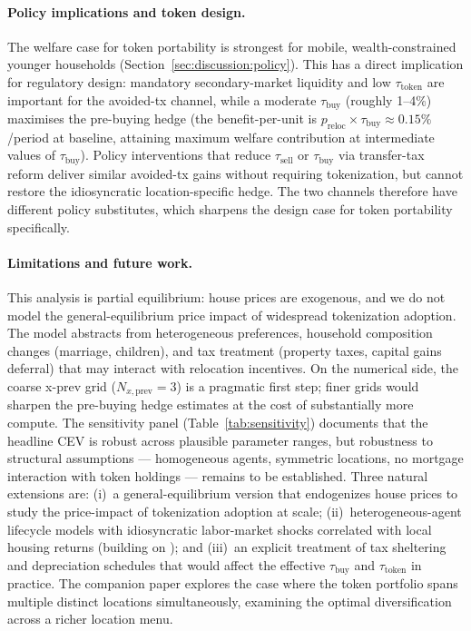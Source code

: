 \paragraph{Policy implications and token design.}
The welfare case for token portability is strongest for mobile, wealth-constrained
younger households (Section~\ref{sec:discussion:policy}).
This has a direct implication for regulatory design: mandatory secondary-market
liquidity and low $\tau_{\text{token}}$ are important for the avoided-tx
channel, while a moderate $\tau_{\text{buy}}$ (roughly 1--4\%) maximises the
pre-buying hedge (the benefit-per-unit is $p_{\text{reloc}} \times
\tau_{\text{buy}} \approx 0.15\%$/period at baseline, attaining maximum
welfare contribution at intermediate values of $\tau_{\text{buy}}$).
Policy interventions that reduce $\tau_{\text{sell}}$ or $\tau_{\text{buy}}$
via transfer-tax reform deliver similar avoided-tx gains without requiring
tokenization, but cannot restore the idiosyncratic location-specific hedge.
The two channels therefore have different policy substitutes, which sharpens
the design case for token portability specifically.

\paragraph{Limitations and future work.}
This analysis is partial equilibrium: house prices are exogenous, and we
do not model the general-equilibrium price impact of widespread tokenization
adoption.
The model abstracts from heterogeneous preferences, household composition
changes (marriage, children), and tax treatment (property taxes, capital
gains deferral) that may interact with relocation incentives.
On the numerical side, the coarse x-prev grid ($N_{x,\text{prev}} = 3$) is
a pragmatic first step; finer grids would sharpen the pre-buying hedge
estimates at the cost of substantially more compute.
The sensitivity panel (Table~\ref{tab:sensitivity}) documents that the
headline CEV is robust across plausible parameter ranges, but robustness to
structural assumptions --- homogeneous agents, symmetric locations,
no mortgage interaction with token holdings --- remains to be established.
Three natural extensions are: (i)~a general-equilibrium version that endogenizes
house prices to study the price-impact of tokenization adoption at scale;
(ii)~heterogeneous-agent lifecycle models with idiosyncratic labor-market shocks
correlated with local housing returns (building on \citealt{BFN2014});
and (iii)~an explicit treatment of tax sheltering and depreciation schedules
that would affect the effective $\tau_{\text{buy}}$ and $\tau_{\text{token}}$
in practice.
The companion paper explores the case where the token portfolio spans multiple
distinct locations simultaneously, examining the optimal diversification
across a richer location menu.
